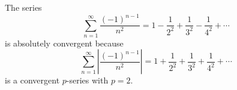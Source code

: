 \begin{frame}
\begin{example} %
The series
\[
\sum_{n=1}^\infty \frac{(-1)^{n-1}}{n^2} = 1 - \frac{1}{2^2} + \frac{1}{3^2} - \frac{1}{4^2} + \cdots%
\]
is absolutely convergent because
\[
\sum_{n=1}^\infty \left| \frac{(-1)^{n-1}}{n^2}\right|  = 1 + \frac{1}{2^2} + \frac{1}{3^2} + \frac{1}{4^2} + \cdots%
\]
is a convergent $p$-series with $p = 2$.
\end{example}
\end{frame}
